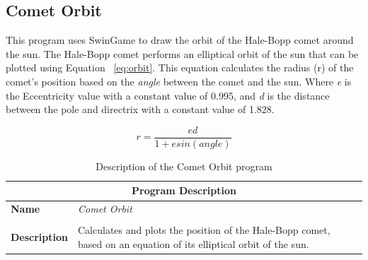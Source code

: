 \begin{figure}[p]
\end{figure}

\begin{figure}[p]
\end{figure}



\clearpage
\subsection{Comet Orbit} %
\label{sub:comet_orbit}

This program uses SwinGame to draw the orbit of the Hale-Bopp comet around the sun. The Hale-Bopp comet performs an elliptical orbit of the sun that can be plotted using Equation~ \ref{eq:orbit}. This equation calculates the radius (r) of the comet's position based on the \emph{angle} between the comet and the sun. Where \emph{e} is the Eccentricity value with a constant value of 0.995, and \emph{d} is the distance between the pole and directrix with a constant value of 1.828.

\begin{equation}
  r = \frac{ed}{1 + e sin(angle)}
  \label{eq:orbit}
\end{equation}

\begin{table}[h]
\centering
\begin{tabular}{l|p{10cm}}
  \hline
  \multicolumn{2}{c}{\textbf{Program Description}} \\
  \hline
  \textbf{Name} & \emph{Comet Orbit} \\
  \\
  \textbf{Description} & Calculates and plots the position of the Hale-Bopp comet, based on an equation of its elliptical orbit of the sun. \\
  \hline
\end{tabular}
\caption{Description of the Comet Orbit program}
\label{tbl:data-comet-orbit}
\end{table}

